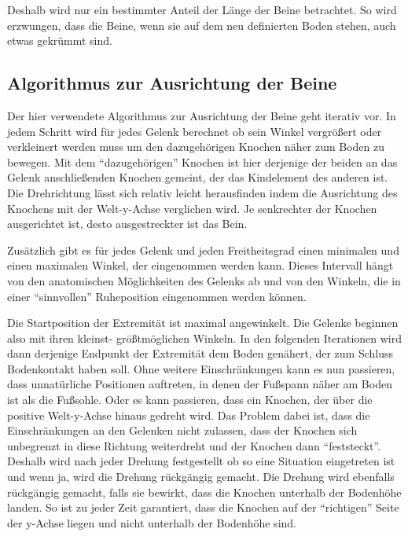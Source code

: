 Deshalb wird nur ein bestimmter Anteil der Länge der Beine betrachtet. So wird erzwungen, dass die Beine, wenn sie auf dem neu definierten Boden stehen, auch etwas gekrümmt sind.



\subsection{Algorithmus zur Ausrichtung der Beine}


Der hier verwendete Algorithmus zur Ausrichtung der Beine geht iterativ vor.
In jedem Schritt wird für jedes Gelenk berechnet ob sein Winkel vergrößert oder verkleinert werden muss um den dazugehörigen Knochen näher zum Boden zu bewegen.
Mit dem "`dazugehörigen"' Knochen ist hier derjenige der beiden an das Gelenk anschließenden Knochen gemeint, der das Kindelement des anderen ist.
Die Drehrichtung lässt sich relativ leicht herausfinden indem die Ausrichtung des Knochens mit der Welt-y-Achse verglichen wird. Je senkrechter der Knochen ausgerichtet ist, desto ausgestreckter ist das Bein.

Zusätzlich gibt es für jedes Gelenk und jeden Freitheitsgrad einen minimalen und einen maximalen Winkel, der eingenommen werden kann. Dieses Intervall hängt von den anatomischen Möglichkeiten des Gelenks ab und von den Winkeln, die in einer "`sinnvollen"' Ruheposition eingenommen werden können. 

Die Startposition der Extremität ist maximal angewinkelt. Die Gelenke beginnen also mit ihren kleinst- \bzw größtmöglichen Winkeln. In den folgenden Iterationen wird dann derjenige Endpunkt der Extremität dem Boden genähert, der zum Schluss Bodenkontakt haben soll.
Ohne weitere Einschränkungen kann es nun passieren, dass unnatürliche Positionen auftreten, in denen \zb der Fußspann näher am Boden ist als die Fußsohle.
Oder es kann passieren, dass ein Knochen, der über die positive Welt-y-Achse hinaus gedreht wird. Das Problem dabei ist, dass die Einschränkungen an den Gelenken nicht zulassen, dass der Knochen sich unbegrenzt in diese Richtung weiterdreht und der Knochen dann "`feststeckt"'. Deshalb wird nach jeder Drehung festgestellt ob so eine Situation eingetreten ist und wenn ja, wird die Drehung rückgängig gemacht.
Die Drehung wird ebenfalls rückgängig gemacht, falls sie bewirkt, dass die Knochen unterhalb der Bodenhöhe landen.
So ist zu jeder Zeit garantiert, dass die Knochen auf der "`richtigen"' Seite der y-Achse liegen und nicht unterhalb der Bodenhöhe sind. %

